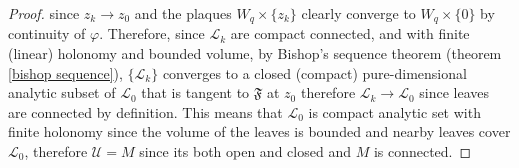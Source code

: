 \documentclass[12pt,twoside,a4paper]{report}
\newtheorem{theorem}{Theorem}[section]
\newcommand{\co}{\ensuremath{\mathbb C }}
\begin{document}
\begin{proof}
since $z_k\rightarrow z_0$ and the plaques $W_q\times\{z_k\}$ clearly converge to $W_q\times\{0\}$ by continuity of $\varphi$.
Therefore, since \(\mathcal{L}_k\) are compact connected, and with finite (linear) holonomy and bounded volume,
by Bishop's sequence theorem (theorem \ref{bishop sequence}), \(\{\mathcal{L}_k\}\) converges to a closed (compact) pure-dimensional analytic subset of $\mathcal{L}_{0}$ that is tangent to $\mathfrak{F}$ at $z_0$ therefore
\hbox{$\mathcal{L}_{k}\rightarrow\mathcal{L}_{0}$} since leaves are connected by definition.
This means that $\mathcal{L}_{0}$ is compact analytic set with finite holonomy since the volume of the leaves is bounded and nearby leaves cover $\mathcal{L}_{0}$,
therefore $\mathcal{U}=M$ since its both open and closed and $M$ is connected.
\end{proof}
\end{document}
